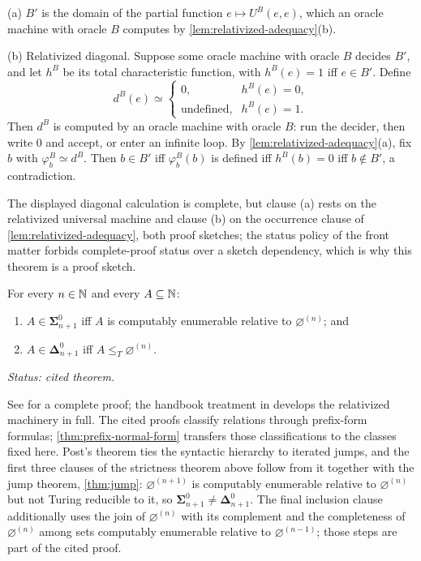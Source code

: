 \begin{proofplan}
(a) \(B'\) is the domain of the partial function
\(e\mapsto U^B(e,e)\), which an oracle machine with oracle \(B\) computes
by \cref{lem:relativized-adequacy}(b).

(b) Relativized diagonal.  Suppose some oracle machine with oracle \(B\)
decides \(B'\), and let \(h^B\) be its total characteristic function,
with \(h^B(e)=1\) iff \(e\in B'\).  Define
\[
  d^B(e)\simeq
  \begin{cases}
    0, & h^B(e)=0,\\
    \text{undefined}, & h^B(e)=1.
  \end{cases}
\]
Then \(d^B\) is computed by an oracle machine with oracle \(B\): run the
decider, then write \(0\) and accept, or enter an infinite loop.  By
\cref{lem:relativized-adequacy}(a), fix \(b\) with
\(\varphi^B_b\simeq d^B\).  Then \(b\in B'\) iff \(\varphi^B_b(b)\) is
defined iff \(h^B(b)=0\) iff \(b\notin B'\), a contradiction.

The displayed diagonal calculation is complete, but clause (a) rests on
the relativized universal machine and clause (b) on the occurrence clause
of \cref{lem:relativized-adequacy}, both proof sketches; the status
policy of the front matter forbids complete-proof status over a sketch
dependency, which is why this theorem is a proof sketch.
\end{proofplan}

\begin{theorem}[Post]
For every \(n\in\mathbb{N}\) and every \(A\subseteq\mathbb{N}\):
\begin{enumerate}
  \item \(A\in\boldsymbol{\Sigma}^0_{n+1}\) iff \(A\) is computably
        enumerable relative to \(\varnothing^{(n)}\); and
  \item \(A\in\boldsymbol{\Delta}^0_{n+1}\) iff
        \(A\leq_T\varnothing^{(n)}\).
\end{enumerate}
\textit{Status: cited theorem.}
\end{theorem}

See \cite{Shoenfield1967} for a complete proof; the handbook treatment in
\cite{Barwise1977} develops the relativized machinery in full.  The cited
proofs classify relations through prefix-form formulas;
\cref{thm:prefix-normal-form} transfers those classifications to the
classes fixed here.  Post's
theorem ties the syntactic hierarchy to iterated jumps, and the first
three clauses of the strictness theorem above follow from it together with
the jump theorem, \cref{thm:jump}:
\(\varnothing^{(n+1)}\) is computably enumerable relative to
\(\varnothing^{(n)}\) but not Turing reducible to it, so
\(\boldsymbol{\Sigma}^0_{n+1}\ne\boldsymbol{\Delta}^0_{n+1}\).  The
final inclusion clause additionally uses the join of
\(\varnothing^{(n)}\) with its complement and the completeness of
\(\varnothing^{(n)}\) among sets computably enumerable relative to
\(\varnothing^{(n-1)}\); those steps are part of the cited proof.

